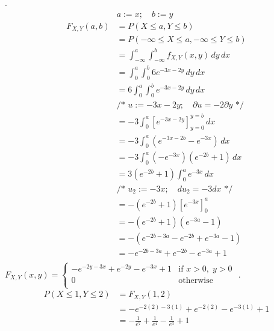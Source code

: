 \documentclass[12pt,border=4pt,multi]{article} %
\begin{document}
\newpage
{}.
\begin{align*}
&a := x; \quad b := y\\
F_{X, Y}(a, b) &= P(X \leq a, Y \leq b)\\
&= P(-\infty \leq X \leq a, -\infty \leq Y \leq b)\\
&= \int_{-\infty}^{a} \int_{-\infty}^{b} f_{X, Y}(x, y)\,dy\,dx\\
&= \int_{0}^{a} \int_{0}^{b} 6e^{-3x - 2y}\,dy\,dx\\
&= 6\int_{0}^{a} \int_{0}^{b} e^{-3x - 2y}\,dy\,dx\\
&\text{/* } u := -3x - 2y;\quad \partial u = -2 \partial y \text{ */}\\
&= -3\int_{0}^{a} [e^{-3x - 2y}]_{y = 0}^{y = b}\,dx\\ 
&= -3\int_{0}^{a} (e^{-3x - 2b} - e^{-3x})\,dx\\ 
&= -3\int_{0}^{a} (-e^{-3x})(e^{-2b} + 1)\,dx\\
&= 3(e^{-2b} + 1)\int_{0}^{a} e^{-3x}\,dx\\
&\text{/* } u_2 := -3x;\quad du_2 = -3dx \text{ */}\\
&= -(e^{-2b} + 1) [e^{-3x}]_0^a\\
&= -(e^{-2b} + 1)(e^{-3a} - 1)\\
&= -(e^{-2b - 3a} - e^{-2b} + e^{-3a} - 1)\\
&= -e^{-2b - 3a} + e^{-2b} - e^{-3a} + 1\\
\end{align*}
$\boxed{F_{X, Y}(x, y) =
\begin{cases}
-e^{-2y - 3x} + e^{-2y} - e^{-3x} + 1 & \text{if } x > 0,\; y > 0\\
0 & \text{otherwise}\\
\end{cases}}$
\newpage
{}.
\begin{align*}
P(X \leq 1, Y \leq 2) &= F_{X, Y}(1, 2)\\
&= -e^{-2(2) - 3(1)} + e^{-2(2)} - e^{-3(1)} + 1\\
&= \boxed{-\frac{1}{e^{7}} + \frac{1}{e^{4}} - \frac{1}{e^{3}} + 1}\\
\end{align*}
\end{document}
